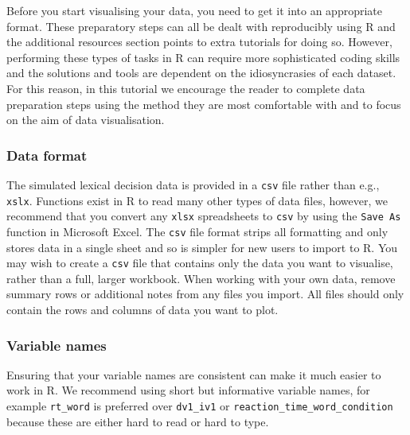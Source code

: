 \documentclass[
  english,
  doc,floatsintext]{apa6}
\begin{document}
Before you start visualising your data, you need to get it into an appropriate format. These preparatory steps can all be dealt with reproducibly using R and the additional resources section points to extra tutorials for doing so. However, performing these types of tasks in R can require more sophisticated coding skills and the solutions and tools are dependent on the idiosyncrasies of each dataset. For this reason, in this tutorial we encourage the reader to complete data preparation steps using the method they are most comfortable with and to focus on the aim of data visualisation.

\hypertarget{data-format}{%
\subsubsection{Data format}\label{data-format}}

The simulated lexical decision data is provided in a \texttt{csv} file rather than e.g., \texttt{xslx}. Functions exist in R to read many other types of data files, however, we recommend that you convert any \texttt{xlsx} spreadsheets to \texttt{csv} by using the \texttt{Save\ As} function in Microsoft Excel. The \texttt{csv} file format strips all formatting and only stores data in a single sheet and so is simpler for new users to import to R. You may wish to create a \texttt{csv} file that contains only the data you want to visualise, rather than a full, larger workbook. When working with your own data, remove summary rows or additional notes from any files you import. All files should only contain the rows and columns of data you want to plot.

\hypertarget{variable-names}{%
\subsubsection{Variable names}\label{variable-names}}

Ensuring that your variable names are consistent can make it much easier to work in R. We recommend using short but informative variable names, for example \texttt{rt\_word} is preferred over \texttt{dv1\_iv1} or \texttt{reaction\_time\_word\_condition} because these are either hard to read or hard to type.
\end{document}
